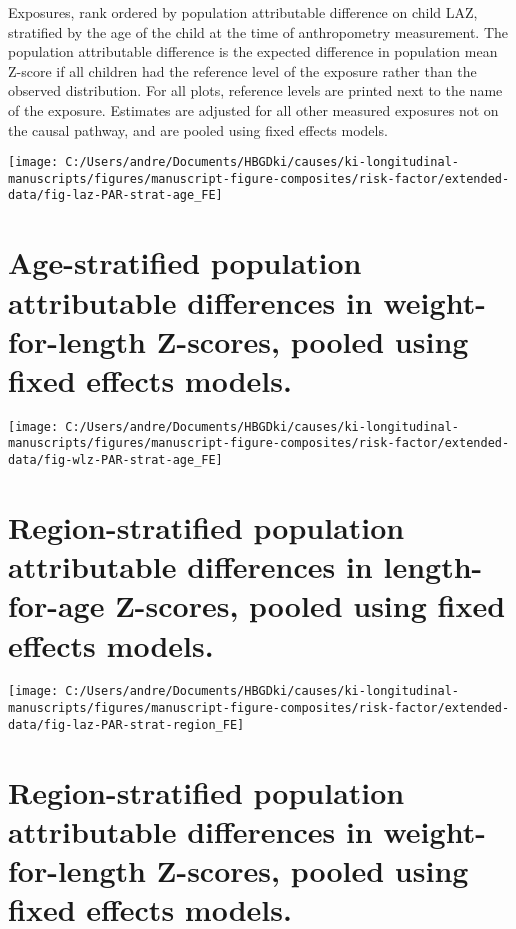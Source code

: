 \documentclass[
  9pt,
]{book}
\begin{document}
Exposures, rank ordered by population attributable difference on child LAZ, stratified by the age of the child at the time of anthropometry measurement. The population attributable difference is the expected difference in population mean Z-score if all children had the reference level of the exposure rather than the observed distribution. For all plots, reference levels are printed next to the name of the exposure. Estimates are adjusted for all other measured exposures not on the causal pathway, and are pooled using fixed effects models.

\texttt{[image: C:/Users/andre/Documents/HBGDki/causes/ki-longitudinal-manuscripts/figures/manuscript-figure-composites/risk-factor/extended-data/fig-laz-PAR-strat-age\_FE]}

\hypertarget{age-stratified-population-attributable-differences-in-weight-for-length-z-scores-pooled-using-fixed-effects-models.}{%
\section{Age-stratified population attributable differences in weight-for-length Z-scores, pooled using fixed effects models.}\label{age-stratified-population-attributable-differences-in-weight-for-length-z-scores-pooled-using-fixed-effects-models.}}

\texttt{[image: C:/Users/andre/Documents/HBGDki/causes/ki-longitudinal-manuscripts/figures/manuscript-figure-composites/risk-factor/extended-data/fig-wlz-PAR-strat-age\_FE]}

\hypertarget{region-stratified-population-attributable-differences-in-length-for-age-z-scores-pooled-using-fixed-effects-models.}{%
\section{Region-stratified population attributable differences in length-for-age Z-scores, pooled using fixed effects models.}\label{region-stratified-population-attributable-differences-in-length-for-age-z-scores-pooled-using-fixed-effects-models.}}

\texttt{[image: C:/Users/andre/Documents/HBGDki/causes/ki-longitudinal-manuscripts/figures/manuscript-figure-composites/risk-factor/extended-data/fig-laz-PAR-strat-region\_FE]}

\hypertarget{region-stratified-population-attributable-differences-in-weight-for-length-z-scores-pooled-using-fixed-effects-models.}{%
\section{Region-stratified population attributable differences in weight-for-length Z-scores, pooled using fixed effects models.}\label{region-stratified-population-attributable-differences-in-weight-for-length-z-scores-pooled-using-fixed-effects-models.}}
\end{document}
